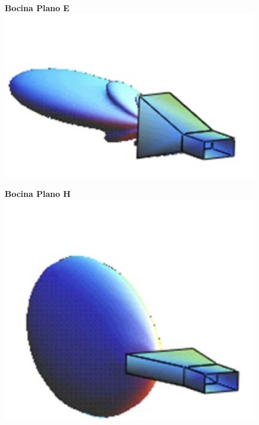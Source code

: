 \documentclass[twocolumn, 8pt]{extarticle}
\begin{document}
\begin{multicols}{2}
    \begin{figure}[H]
        \centering
        \textbf{Bocina Plano E}
        \includegraphics[width=\columnwidth]{bocina_e.png}
    \end{figure}

    \begin{figure}[H]
        \centering
        \textbf{Bocina Plano H}
        \includegraphics[width=\columnwidth]{bocina_h.png}
    \end{figure}
\end{multicols}
\end{document}
